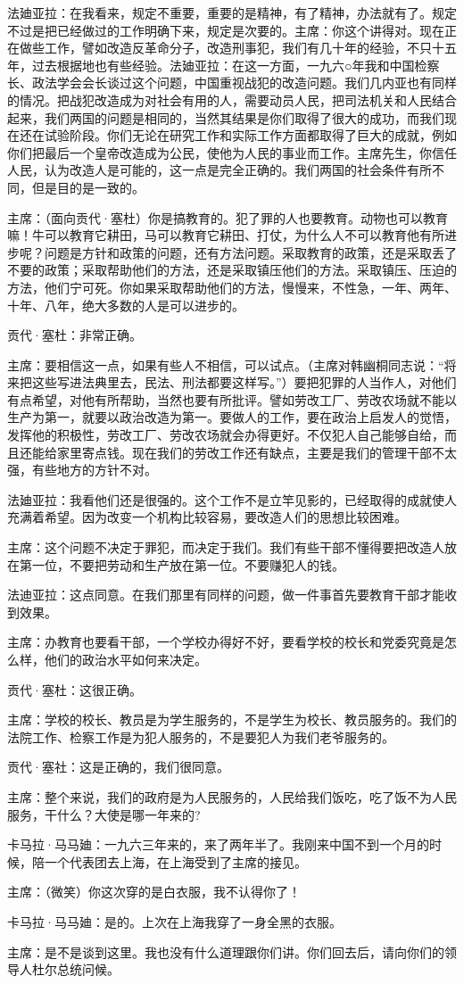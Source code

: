 法廸亚拉：在我看来，规定不重要，重要的是精神，有了精神，办法就有了。规定不过是把已经做过的工作明确下来，规定是次要的。主席：你这个讲得对。现在正在做些工作，譬如改造反革命分子，改造刑事犯，我们有几十年的经验，不只十五年，过去根据地也有些经验。法廸亚拉：在这一方面，一九六○年我和中国检察长、政法学会会长谈过这个问题，中国重视战犯的改造问题。我们几内亚也有同样的情况。把战犯改造成为对社会有用的人，需要动员人民，把司法机关和人民结合起来，我们两国的问题是相同的，当然其结果是你们取得了很大的成功，而我们现在还在试验阶段。你们无论在研究工作和实际工作方面都取得了巨大的成就，例如你们把最后一个皇帝改造成为公民，使他为人民的事业而工作。主席先生，你信任人民，认为改造人是可能的，这一点是完全正确的。我们两国的社会条件有所不同，但是目的是一致的。

主席：（面向贡代·塞杜）你是搞教育的。犯了罪的人也要教育。动物也可以教育嘛！牛可以教育它耕田，马可以教育它耕田、打仗，为什么人不可以教育他有所进步呢？问题是方针和政策的问题，还有方法问题。采取教育的政策，还是采取丢了不要的政策；采取帮助他们的方法，还是采取镇压他们的方法。采取镇压、压迫的方法，他们宁可死。你如果采取帮助他们的方法，慢慢来，不性急，一年、两年、十年、八年，绝大多数的人是可以进步的。

贡代·塞杜：非常正确。

主席：要相信这一点，如果有些人不相信，可以试点。（主席对韩幽桐同志说：“将来把这些写进法典里去，民法、刑法都要这样写。”）要把犯罪的人当作人，对他们有点希望，对他有所帮助，当然也要有所批评。譬如劳改工厂、劳改农场就不能以生产为第一，就要以政治改造为第一。要做人的工作，要在政治上启发人的觉悟，发挥他的积极性，劳改工厂、劳改农场就会办得更好。不仅犯人自己能够自给，而且还能给家里寄点钱。现在我们的劳改工作还有缺点，主要是我们的管理干部不太强，有些地方的方针不对。

法廸亚拉：我看他们还是很强的。这个工作不是立竿见影的，已经取得的成就使人充满着希望。因为改变一个机构比较容易，要改造人们的思想比较困难。

主席：这个问题不决定于罪犯，而决定于我们。我们有些干部不懂得要把改造人放在第一位，不要把劳动和生产放在第一位。不要赚犯人的钱。

法迪亚拉：这点同意。在我们那里有同样的问题，做一件事首先要教育干部才能收到效果。

主席：办教育也要看干部，一个学校办得好不好，要看学校的校长和党委究竟是怎么样，他们的政治水平如何来决定。

贡代·塞杜：这很正确。

主席：学校的校长、教员是为学生服务的，不是学生为校长、教员服务的。我们的法院工作、检察工作是为犯人服务的，不是要犯人为我们老爷服务的。

贡代·塞社：这是正确的，我们很同意。

主席：整个来说，我们的政府是为人民服务的，人民给我们饭吃，吃了饭不为人民服务，干什么？大使是哪一年来的?

卡马拉·马马廸：一九六三年来的，来了两年半了。我刚来中国不到一个月的时候，陪一个代表团去上海，在上海受到了主席的接见。

主席：（微笑）你这次穿的是白衣服，我不认得你了！

卡马拉·马马廸：是的。上次在上海我穿了一身全黑的衣服。

主席：是不是谈到这里。我也没有什么道理跟你们讲。你们回去后，请向你们的领导人杜尔总统问候。


